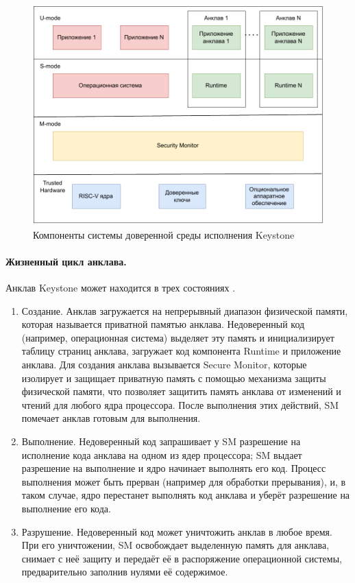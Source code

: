 \begin{figure}[h]
	\centering
	\includegraphics[width=\textwidth]{img/riscv-enclave-arch.pdf}
	\caption{Компоненты системы доверенной среды исполнения Keystone}
	\label{fig:riscv-enclave-arch}
\end{figure}

\paragraph{Жизненный цикл анклава.}

Анклав Keystone может находится в трех состояниях \cite{keystone-overview}.

\begin{enumerate}
	\item Создание. Анклав загружается на непрерывный диапазон физической памяти, которая называется приватной памятью анклава. Недоверенный код (например, операционная система) выделяет эту память и инициализирует таблицу страниц анклава, загружает код компонента Runtime и приложение анклава. Для создания анклава вызывается Secure Monitor, которые изолирует и защищает приватную память с помощью механизма защиты физической памяти, что позволяет защитить память анклава от изменений и чтений для любого ядра процессора. После выполнения этих действий, SM помечает анклав  готовым для выполнения.
	\item Выполнение. Недоверенный код запрашивает у SM разрешение на исполнение кода анклава на одном из ядер процессора; SM выдает разрешение на выполнение и ядро начинает выполнять его код. Процесс выполнения может быть прерван (например для обработки прерывания), и, в таком случае, ядро перестанет выполнять код анклава и уберёт разрешение на выполнение его кода.
	\item Разрушение. Недоверенный код может уничтожить анклав в любое время. При его уничтожении, SM освобождает выделенную память для анклава, снимает с неё защиту и передаёт её в распоряжение операционной системы, предварительно заполнив нулями её содержимое.
\end{enumerate}

